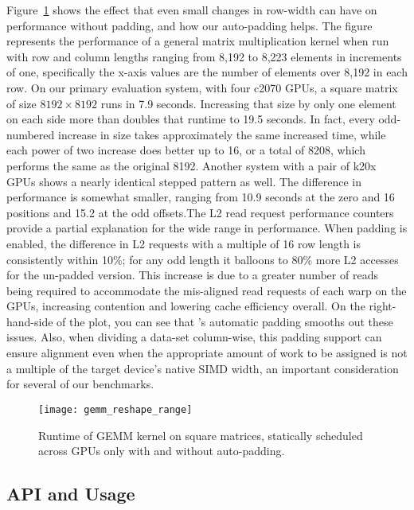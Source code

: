 Figure~\ref{fig:reshape} shows the effect that even small changes in row-width
can have on performance without padding, and how our auto-padding helps.  The
figure represents the performance of a general matrix multiplication kernel
when run with row and column lengths ranging from 8,192 to 8,223 elements in
increments of one, specifically the x-axis values are the number of elements
over 8,192 in each row.  On our primary evaluation system, with four c2070
GPUs, a square matrix of size $8192\times8192$ runs in 7.9 seconds.
Increasing that size by only one element on each side more than doubles that
runtime to 19.5 seconds.  In fact, every odd-numbered increase in size takes
approximately the same increased time, while each power of two increase does
better up to 16, or a total of 8208, which performs the same as the original
8192.  Another system with a pair of k20x GPUs shows a nearly identical
stepped pattern as well.  The difference in performance is somewhat smaller,
ranging from 10.9 seconds at the zero and 16 positions and 15.2 at the odd
offsets.The L2 read request performance counters provide a partial explanation
for the wide range in performance.  When padding is enabled, the difference in
L2 requests with a multiple of 16 row length is consistently within 10\%; for
any odd length it balloons to 80\% more L2 accesses for the un-padded version.
This increase is due to a greater number of reads being required to
accommodate the mis-aligned read requests of each warp on the GPUs, increasing
contention and lowering cache efficiency overall.  On the right-hand-side of
the plot, you can see that \tsar's automatic padding smooths out these issues.
Also, when dividing a data-set column-wise, this padding support can ensure
alignment even when the appropriate amount of work to be assigned is not a
multiple of the target device's native SIMD width, an important consideration
for several of our benchmarks.

\begin{figure}[t]
        \texttt{[image: gemm\_reshape\_range]}
        \caption{Runtime of GEMM kernel on square matrices, statically
          scheduled across GPUs only with and without
          auto-padding.\label{fig:reshape}}
\end{figure}


\subsection{\tsar API and Usage}
\label{sec:using}
\label{sec:api}

